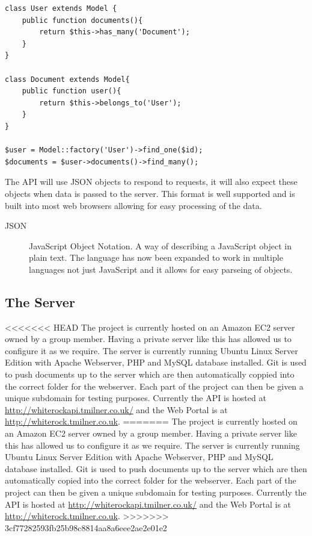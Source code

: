 \documentclass[11pt,a4paper]{article}
\begin{document}
\begin{lstlisting}[captionpos=b, caption=Model Snippet, label=lst:model, frame=single]
class User extends Model {
	public function documents(){
		return $this->has_many('Document');
	}
}

class Document extends Model{
	public function user(){
		return $this->belongs_to('User');
	}
}

$user = Model::factory('User')->find_one($id); 
$documents = $user->documents()->find_many();
\end{lstlisting}

The API will use JSON objects to respond to requests, it will also expect these objects when data is passed to the server. This format is well supported and is built into most web browsers allowing for easy processing of the data.

\begin{description}
\item[JSON] JavaScript Object Notation. A way of describing a JavaScript object in plain text. The language has now been expanded to work in multiple languages not just JavaScript and it allows for easy parseing of objects. 
\end{description}

\subsection{The Server}
<<<<<<< HEAD
\label{sec:techServer}
The project is currently hosted on an Amazon EC2 server owned by a group member. Having a private server like this has allowed us to configure it as we require. The server is currently running Ubuntu Linux Server Edition with Apache Webserver, PHP and MySQL database installed. Git is used to push documents up to the server which are then automatically coppied into the correct folder for the webserver. Each part of the project can then be given a unique subdomain for testing purposes. Currently the API is hosted at \url{http://whiterockapi.tmilner.co.uk/} and the Web Portal is at \url{http://whiterock.tmilner.co.uk}.
=======
The project is currently hosted on an Amazon EC2 server owned by a group member. Having a private server like this has allowed us to configure it as we require. The server is currently running Ubuntu Linux Server Edition with Apache Webserver, PHP and MySQL database installed. Git is used to push documents up to the server which are then automatically copied into the correct folder for the webserver. Each part of the project can then be given a unique subdomain for testing purposes. Currently the API is hosted at \url{http://whiterockapi.tmilner.co.uk/} and the Web Portal is at \url{http://whiterock.tmilner.co.uk}.
>>>>>>> 3cf77282593fb25b98c8814aa8a6eee2ae2e01e2
\end{document}
